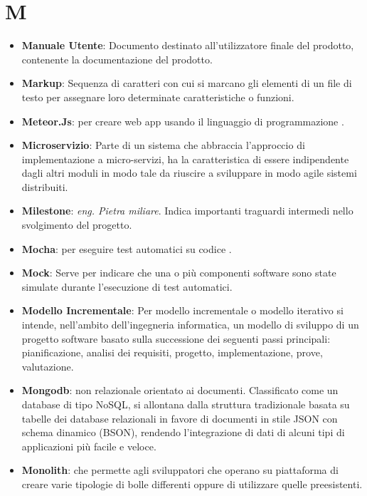 \section{M}
\begin{itemize}
	\item
	\textbf{Manuale Utente}: Documento destinato all'utilizzatore finale del prodotto, contenente la documentazione del prodotto.
	\item
	\textbf{Markup}: Sequenza di caratteri con cui si marcano gli elementi di un file di testo per assegnare loro determinate caratteristiche o funzioni.
	\item
	\textbf{Meteor.Js}:  per creare web app usando il linguaggio di programmazione .
	\item
	\textbf{Microservizio}: Parte di un sistema che abbraccia l'approccio di implementazione a micro-servizi, ha la caratteristica di essere indipendente dagli altri moduli in modo tale da riuscire a sviluppare in modo agile sistemi distribuiti.
	\item
	\textbf{Milestone}: \textit{eng. Pietra miliare}. Indica importanti traguardi intermedi nello svolgimento del progetto.
	\item
	\textbf{Mocha}:  per eseguire test automatici su codice .
	\item
	\textbf{Mock}: Serve per indicare che una o più componenti software sono state simulate durante l'esecuzione di test automatici.
	\item
	\textbf{Modello Incrementale}: Per modello incrementale o modello iterativo si intende, nell'ambito dell'ingegneria informatica, un modello di sviluppo di un progetto software basato sulla successione dei seguenti passi principali: pianificazione, analisi dei requisiti, progetto, implementazione, prove, valutazione.
	\item
	\textbf{Mongodb}:  non relazionale orientato ai documenti. Classificato come un database di tipo NoSQL,  si allontana dalla struttura tradizionale basata su tabelle dei database relazionali in favore di documenti in stile JSON con schema dinamico (BSON), rendendo l'integrazione di dati di alcuni tipi di applicazioni più facile e veloce.
	\item
	\textbf{Monolith}:  che permette agli sviluppatori che operano su piattaforma  di creare varie tipologie di bolle differenti oppure di utilizzare quelle preesistenti.
\end{itemize}
\newpage